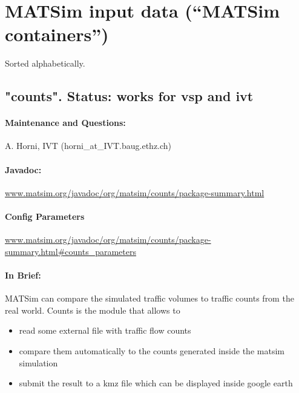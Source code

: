 \chapter{MATSim input data (``MATSim containers'')}

Sorted alphabetically.

\section{"counts". Status: works for vsp and ivt}

\subsubsection{\textbf{Maintenance and Questions:}}

A. Horni, IVT (horni\_at\_IVT.baug.ethz.ch)

\subsubsection{\textbf{\textbf{Javadoc:
\\}}}

\href{http://www.matsim.org/javadoc/org/matsim/counts/package-summary.html}{www.matsim.org/javadoc/org/matsim/counts/package-summary.html}


\subsubsection{\textbf{\textbf{Config Parameters{}}}}

\href{http://www.matsim.org/javadoc/org/matsim/counts/package-summary.html#counts_parameters}{www.matsim.org/javadoc/org/matsim/counts/package-summary.html\#counts\_parameters}

\subsubsection{\textbf{In Brief:}}

MATSim can compare the simulated traffic volumes to traffic counts from the real world. Counts is the module that allows to
\begin{itemize}
	\item read some external file with traffic flow counts
	\item compare them automatically to the counts generated inside the matsim simulation
	\item submit the result to a kmz file which can be displayed inside google earth
\end{itemize}

